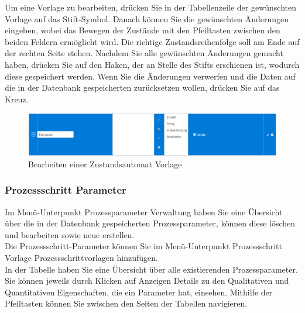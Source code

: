 \documentclass[enabledeprecatedfontcommands,fontsize=12pt,paper=a4,twoside]{scrartcl}
\begin{document}
Um eine Vorlage zu bearbeiten, drücken Sie in der Tabellenzeile der gewünschten Vorlage auf das Stift-Symbol. Danach können Sie die gewünschten Änderungen eingeben, wobei das Bewegen der Zustände mit den Pfeiltasten zwischen den beiden Feldern ermöglicht wird. Die richtige Zustandsreihenfolge soll am Ende auf der rechten Seite stehen. Nachdem Sie alle gewünschten Änderungen gemacht haben, drücken Sie auf den Haken, der an Stelle des Stifts erschienen ist, wodurch diese gespeichert werden. Wenn Sie die Änderungen verwerfen und die Daten auf die in der Datenbank gespeicherten zurücksetzen wollen, drücken Sie auf das Kreuz. \\

\begin{figure}[h!]
\begin{center}
 \includegraphics[width=\textwidth]{screenshots/pk/zustandsautomatbearbeiten.png}
  \caption{Bearbeiten einer Zustandsautomat Vorlage}
  \label{fig:boat2}
\end{center}
\end{figure}

\subsubsection{Prozessschritt Parameter}

Im Menü-Unterpunkt Prozessparameter Verwaltung haben Sie eine Übersicht über die in der Datenbank gespeicherten Prozessparameter, können diese löschen und bearbeiten sowie neue erstellen. \\

Die Prozessschritt-Parameter können Sie im Menü-Unterpunkt Prozessschritt Vorlage Prozessschrittvorlagen hinzufügen. \\

In der Tabelle haben Sie eine Übersicht über alle existierenden Prozessparameter. Sie können jeweils durch Klicken auf Anzeigen Details zu den Qualitativen und Quantitativen Eigenschaften, die ein Parameter hat, einsehen. Mithilfe der Pfeiltasten können Sie zwischen den Seiten der Tabellen navigieren. \\
\end{document}
